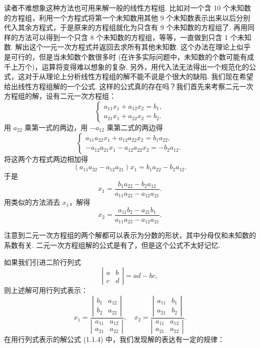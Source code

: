 \documentclass[UTF8, 12pt, fontset=fandol, oneside]{ctexart}
\begin{document}
读者不难想象这种方法也可用来解一般的线性方程组. 比如对一个含 10 个未知数的方程组，利用一个方程式将第一个未知数用其他 9 个未知数表示出来以后分别代入其余方程式，于是原来的方程组就化为只含有 9 个未知数的方程组了. 再用同样的方法可以得到一个只含 8 个未知数的方程组，等等，一直做到只含 1 个未知数. 解出这个一元一次方程式并返回去求所有其他未知数. 这个办法在理论上似乎是可行的，但是当未知数个数很多时 (在许多实际问题中，未知数的个数可能有成千上万个)，运算将变得难以想象的复杂. 另外，用代入法无法得出一个规范化的公式，这对于从理论上分析线性方程组的解不能不说是个很大的缺陷. 我们现在希望给出线性方程组解的一个公式. 这样的公式真的存在吗？我们首先来考察二元一次方程组的解，设有二元一次方程组：
\begin{equation}
\left\{
\begin{array}{l}
a_{11}x_1+a_{12}x_2=b_1,\\
a_{21}x_1+a_{22}x_2=b_2.
\end{array}
\right.
\tag{1.1.3}
\end{equation}
用 $a_{22}$ 乘第一式的两边，用 $-a_{12}$ 乘第二式的两边得
\[
\left\{
\begin{array}{l}
a_{11}a_{22}x_1+a_{12}a_{22}x_2=b_1a_{22},\\
-a_{12}a_{21}x_1-a_{12}a_{22}x_2=-b_2a_{12}.
\end{array}
\right.
\]
将这两个方程式两边相加得
\[
(a_{11}a_{22}-a_{12}a_{21})x_1=b_1a_{22}-b_2a_{12}.
\]
于是
\[
x_1=\frac{b_1a_{22}-b_2a_{12}}{a_{11}a_{22}-a_{12}a_{21}}.
\]
用类似的方法消去 $x_1$，解得
\[
x_2=\frac{a_{11}b_2-a_{21}b_1}{a_{11}a_{22}-a_{12}a_{21}}.
\]

注意到二元一次方程组的两个解都可以表示为分数的形状，其中分母仅和未知数的系数有关. 二元一次方程组解的公式是有了，但是这个公式不太好记忆.

如果我们引进二阶行列式
\[
\left|\begin{array}{cc}
a & b\\
c & d
\end{array}\right|=ad-bc,
\]
则上述解可用行列式表示：
\begin{equation}
x_1=
\frac{\left|\begin{array}{cc}
b_1 & a_{12}\\
b_2 & a_{22}
\end{array}\right|}
{\left|\begin{array}{cc}
a_{11} & a_{12}\\
a_{21} & a_{22}
\end{array}\right|},\quad
x_2=
\frac{\left|\begin{array}{cc}
a_{11} & b_1\\
a_{21} & b_2
\end{array}\right|}
{\left|\begin{array}{cc}
a_{11} & a_{12}\\
a_{21} & a_{22}
\end{array}\right|}.
\tag{1.1.4}
\end{equation}
在用行列式表示的解公式 (1.1.4) 中，我们发现解的表达有一定的规律：
\end{document}
